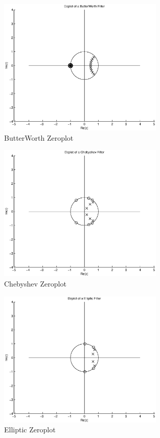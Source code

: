 \begin{homeworkProblem}
\begin{figure}[!htbp]
  \centering
    \includegraphics[width=0.7\textwidth]{Figures/PS9-5-4.eps}
  \caption{ButterWorth Zeroplot}
\end{figure}

\begin{figure}[!htbp]
  \centering
    \includegraphics[width=0.7\textwidth]{Figures/PS9-5-5.eps}
  \caption{Chebyshev Zeroplot}
\end{figure}

\begin{figure}[!htbp]
  \centering
    \includegraphics[width=0.7\textwidth]{Figures/PS9-5-6.eps}
  \caption{Elliptic Zeroplot}
\end{figure}



\end{homeworkProblem}

